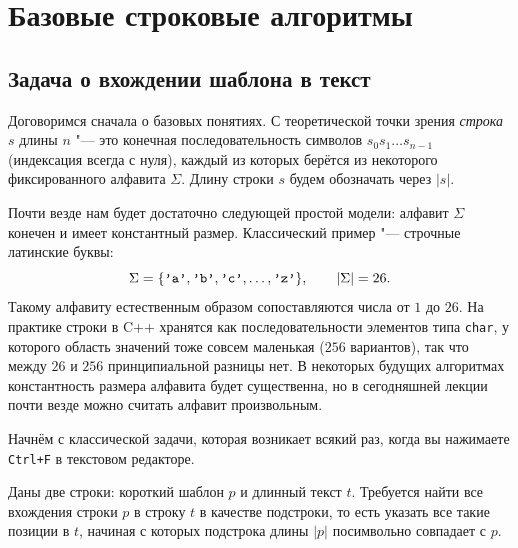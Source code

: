\section{Базовые строковые алгоритмы}

\subsection{Задача о вхождении шаблона в текст}

Договоримся сначала о базовых понятиях. С теоретической точки зрения \textit{строка} $s$ длины $n$ "--- это конечная последовательность символов $s_0 s_1 \dots s_{n-1}$ (индексация всегда с нуля), каждый из которых берётся из некоторого фиксированного алфавита $\Sigma$. Длину строки $s$ будем обозначать через $|s|$.

Почти везде нам будет достаточно следующей простой модели: алфавит $\Sigma$ конечен и имеет константный размер. Классический пример "--- строчные латинские буквы:
\[
    \Sigma = \{\text{\texttt{'a'}}, \text{\texttt{'b'}}, \text{\texttt{'c'}}, \dots, \text{\texttt{'z'}}\}, \qquad |\Sigma| = 26.
\]
Такому алфавиту естественным образом сопоставляются числа от $1$ до $26$. На практике строки в C++ хранятся как последовательности элементов типа \texttt{char}, у которого область значений тоже совсем маленькая ($256$ вариантов), так что между $26$ и $256$ принципиальной разницы нет. В некоторых будущих алгоритмах константность размера алфавита будет существенна, но в сегодняшней лекции почти везде можно считать алфавит произвольным.

Начнём с классической задачи, которая возникает всякий раз, когда вы нажимаете \texttt{Ctrl+F} в текстовом редакторе.

\begin{problem}
    Даны две строки: короткий шаблон $p$ и длинный текст $t$. Требуется найти все вхождения строки $p$ в строку $t$ в качестве подстроки, то есть указать все такие позиции в $t$, начиная с которых подстрока длины $|p|$ посимвольно совпадает с $p$.
\end{problem}

\begin{center}
\end{center}

